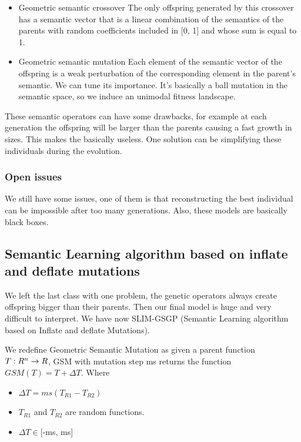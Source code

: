 \begin{itemize}
    \item Geometric semantic crossover \ra The only offspring generated by this crossover has a semantic vector that is a linear combination of the semantics of the parents with random coefficients included in [0, 1] and whose sum is equal to 1. 
    \item Geometric semantic mutation \ra Each element of the semantic vector of the offspring is a weak perturbation of the corresponding element in the parent's semantic. We can tune its importance. It's basically a ball mutation in the semantic space, so we induce an unimodal fitness landscape.   
\end{itemize}

These semantic operators can have some drawbacks, for example at each generation the offspring will be larger than the parents causing a fast growth in sizes. This makes the basically useless. One solution can be simplifying these individuals during the evolution.

\subsubsection{Open issues}

We still have some issues, one of them is that reconstructing the best individual can be impossible after too many generations. Also, these models are basically black boxes. 

\newpage

\subsection{Semantic Learning algorithm based on inflate and deflate mutations}

We left the last class with one problem, the genetic operators always create offspring bigger than their parents. Then our final model is huge and very difficult to interpret. We have now SLIM-GSGP (Semantic Learning algorithm based on Inflate and deflate Mutations). 

\vspace{10pt}

We redefine Geometric Semantic Mutation as \ra given a parent function $T:R^n \rightarrow R$, GSM with mutation step ms returns the function $GSM(T)=T+\Delta T$. Where

\begin{itemize}
    \item $\Delta T = ms (T_{R1} - T_{R2})$
    \item $T_{R1}$ and $T_{R2}$ are random functions. 
    \item $\Delta T \in $[-ms, ms]
\end{itemize}



